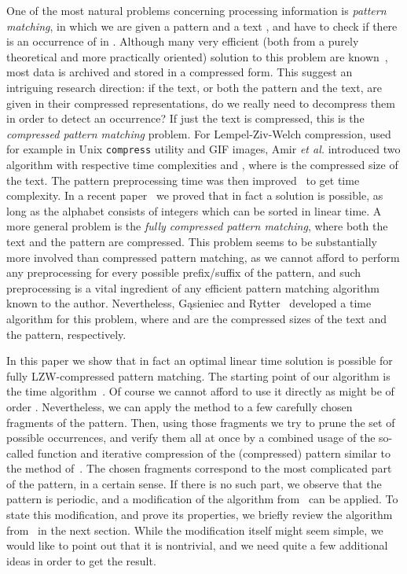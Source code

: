 \documentclass[runningheads]{llncs}
\begin{document}
One of the most natural problems concerning processing information is {\it pattern matching}, in which we are given a pattern  and a text , and have to check if there is an occurrence of  in . Although many very efficient (both from a purely theoretical and more practically oriented) solution to this problem are known~\cite{MP,RealGalil,KMP,ConstGalil,Breslauer,BM}, most data is archived and stored in a compressed form. This suggest an intriguing research direction: if the text, or both the pattern and the text, are given in their compressed representations, do we really need to decompress them in order to detect an occurrence? If just the text is compressed, this is the {\it compressed pattern matching} problem. For Lempel-Ziv-Welch compression, used for example in Unix \texttt{compress} utility and GIF images, Amir {\it et al.} introduced two algorithm with respective time complexities  and , where  is the compressed size of the text. The pattern preprocessing time was then improved~\cite{Kosaraju} to get  time complexity. In a recent paper~\cite{GawrychowskiLZW} we proved that in fact a  solution is possible, as long as the alphabet consists of integers which can be sorted in linear time. A more general problem is the {\it fully compressed pattern matching}, where both the text and the pattern are compressed.
This problem seems to be substantially more involved than compressed pattern matching, as we cannot afford to perform any preprocessing for every possible prefix/suffix of the pattern, and such preprocessing is a vital ingredient of any efficient pattern matching algorithm known to the author.
Nevertheless, G\k{a}sieniec and Rytter~\cite{RytterGasieniec} developed a  time algorithm for this problem, where  and  are the compressed sizes of the text and the pattern, respectively. 

In this paper we show that in fact an optimal linear time solution is possible for fully LZW-compressed pattern matching. The starting point of our algorithm is the  time algorithm~\cite{GawrychowskiLZW}. Of course we cannot afford to use it directly as  might be of order . Nevertheless, we can apply the method to a few carefully chosen fragments of the pattern. Then, using those fragments we try to prune the set of possible occurrences, and verify them all at once by a combined usage of the so-called  function and iterative compression of the (compressed) pattern similar to the method of~\cite{RytterGasieniec}. The chosen fragments correspond to the most complicated part of the pattern, in a certain sense. If there is no such part, we observe that the pattern is periodic, and a modification of the algorithm from~\cite{GawrychowskiLZW} can be applied. To state this modification, and prove its properties, we briefly review the algorithm from~\cite{GawrychowskiLZW} in the next section. While the modification itself might seem simple, we would like to point out that it is nontrivial, and we need quite a few additional ideas in order to get the result.
\end{document}
